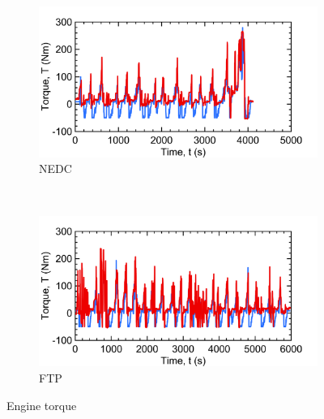 \begin{figure}[ht]
  \centering
  \begin{subfigure}[b]{0.45\textwidth}
    \includegraphics[width=\textwidth]{figures/model/NEDC_plt_T_engine.png}
    \caption{NEDC}
    \label{fig:NEDC_T_engine}
  \end{subfigure}
  ~ %
  \begin{subfigure}[b]{0.45\textwidth}
    \includegraphics[width=\textwidth]{figures/model/FTP_plt_T_engine.png}
    \caption{FTP}
    \label{fig:FTP_T_engine}
  \end{subfigure}
  \caption{Engine torque}\label{fig:T_engine}
\end{figure}


